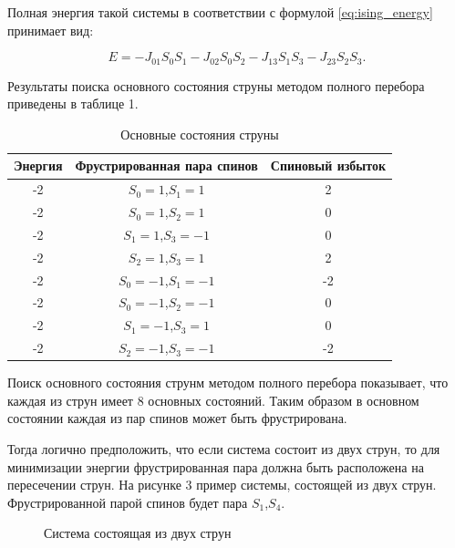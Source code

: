\documentclass[utf8, babel, sor, jor, amsmath, amssymb, reprint]{elsarticle} %
\begin{document}
Полная энергия такой системы в соответствии с формулой \eqref{eq:ising_energy} принимает вид:

\begin{equation}
	E = -J_{01} S_0 S_1-J_{02} S_0 S_2-J_{13} S_1 S_3-J_{23} S_2 S_3.
	\label{eq:ising_energy_2x2}
\end{equation}

Результаты поиска основного состояния струны методом полного перебора приведены в таблице 1.

\begin{table}[h]
	\centering
	\begin{tabular}{|c|c|c|}
		\hline
	Энергия & Фрустрированная пара спинов & Спиновый избыток \\
	\hline
	-2 & $S_0=1$,$S_1=1$ & 2\\
	\hline
	-2	& $S_0=1$,$S_2=1$ &	0\\
	\hline
	-2 & 	$S_1=1$,$S_3=-1$ &	0\\
	\hline
	-2 &	$S_2=1$,$S_3=1$	& 2\\
	\hline
	-2 &	$S_0=-1$,$S_1=-1$ &	-2\\
	\hline
	-2 &	$S_0=-1$,$S_2=-1$ &	0\\
	\hline
	-2 &	$S_1=-1$,$S_3=1$ &	0\\
	\hline
	-2 &	$S_2=-1$,$S_3=-1$ & -2\\
		\hline
	\end{tabular}
	\caption{Основные состояния струны}
	\label{tab:Strunags}
\end{table}

Поиск основного состояния струнм методом полного перебора показывает, что каждая из струн имеет 8 основных состояний. Таким образом в основном состоянии каждая из пар спинов может быть фрустрирована.

Тогда логично предположить, что если система состоит из двух струн, то для минимизации энергии фрустрированная пара должна быть расположена на пересечении струн. На рисунке 3 пример системы, состоящей из двух струн. Фрустрированной парой спинов будет пара $S_1$,$S_4$.

\begin{figure}[h]
	\centering
	\caption{Система состоящая из двух струн}
	\label{fig:3x2}
\end{figure}
\end{document}
